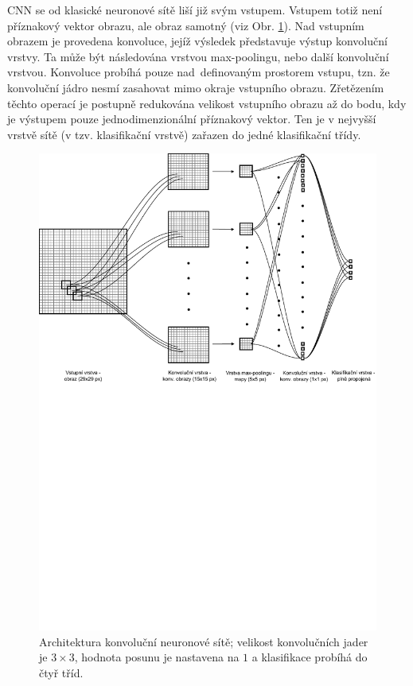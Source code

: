 {\par{CNN se od klasické neuronové sítě liší již svým vstupem. Vstupem totiž není příznakový vektor obrazu, ale obraz samotný (viz Obr. \ref{fig:CNN01}). Nad vstupním obrazem je provedena konvoluce, jejíž výsledek představuje výstup konvoluční vrstvy. Ta může být následována vrstvou max-poolingu, nebo další konvoluční vrstvou. Konvoluce probíhá pouze nad~definovaným prostorem vstupu, tzn. že konvoluční jádro nesmí zasahovat mimo okraje vstupního obrazu. Zřetězením těchto operací je postupně redukována velikost vstupního obrazu až do bodu, kdy je výstupem pouze jednodimenzionální příznakový vektor. Ten je v nejvyšší vrstvě sítě (v tzv. klasifikační vrstvě) zařazen do jedné klasifikační třídy.
\begin{figure}[!ht]
	\centering
	\includegraphics[width = 1\textwidth, trim = 0cm 15cm 0cm 0cm]{./Img/Prednaska09/cnn/CNN01.pdf}
	\caption{Architektura konvoluční neuronové sítě; velikost konvolučních jader je $3\times 3$, hodnota posunu je nastavena na $1$ a klasifikace probíhá do čtyř tříd.}
	\label{fig:CNN01}
\end{figure}}

}
